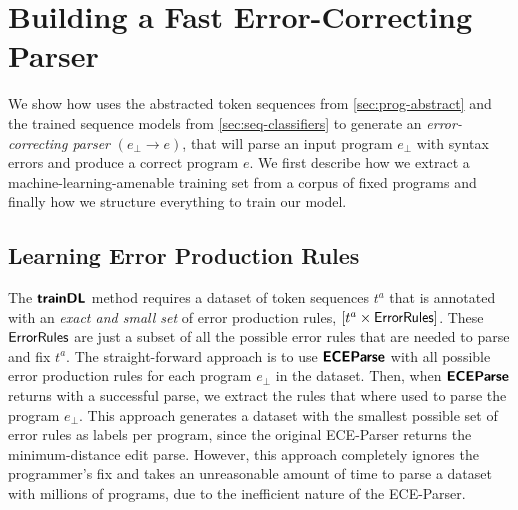 \section{Building a Fast Error-Correcting Parser}
\label{sec:whole-system}

We show how \toolname uses the abstracted token sequences from
\autoref{sec:prog-abstract} and the trained sequence models from
\autoref{sec:seq-classifiers} to generate an \emph{error-correcting parser}
$(e_{\bot} \to e)$, that will parse an input program $e_{\bot}$ with syntax
errors and produce a correct program $e$. We first describe how we extract a
machine-learning-amenable training set from a corpus of fixed programs and
finally how we structure everything to train our model.


\subsection{Learning Error Production Rules}
\label{sec:whole-system:error-rules}

The $\bm{\mathsf{trainDL}}$ method requires a dataset of token sequences $t^a$ that is
annotated with an \emph{exact and small set} of error production rules, \ie
$[t^a \times \mathsf{ErrorRules}]$. These $\mathsf{ErrorRules}$ are just a subset of
all the possible error rules that are needed to parse and fix $t^a$. The
straight-forward approach is to use $\bm{\mathsf{ECEParse}}$ with all possible error
production rules for each program $e_{\bot}$ in the dataset. Then, when
$\bm{\mathsf{ECEParse}}$ returns with a successful parse, we extract the rules that where used
to parse the program $e_{\bot}$. This approach generates a dataset with the
smallest possible set of error rules as labels per program, since the original
ECE-Parser returns the minimum-distance edit parse. However, this approach
completely ignores the programmer's fix and takes an unreasonable amount of time
to parse a dataset with millions of programs, due to the inefficient nature of
the ECE-Parser.

